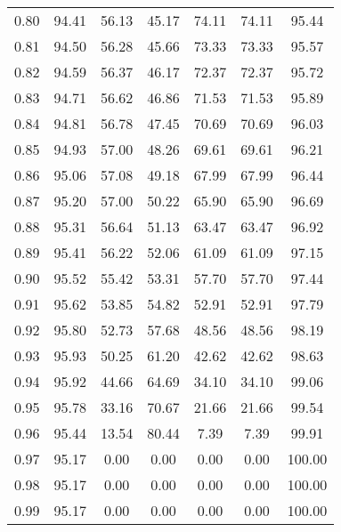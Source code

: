 \begin{tabular}{|c|c|c|c|c|c|c|}
      0.80 &     94.41 &     56.13 &      45.17 &   74.11 &      74.11 &         95.44 \\
      0.81 &     94.50 &     56.28 &      45.66 &   73.33 &      73.33 &         95.57 \\
      0.82 &     94.59 &     56.37 &      46.17 &   72.37 &      72.37 &         95.72 \\
      0.83 &     94.71 &     56.62 &      46.86 &   71.53 &      71.53 &         95.89 \\
      0.84 &     94.81 &     56.78 &      47.45 &   70.69 &      70.69 &         96.03 \\
      0.85 &     94.93 &     57.00 &      48.26 &   69.61 &      69.61 &         96.21 \\
      0.86 &     95.06 &     57.08 &      49.18 &   67.99 &      67.99 &         96.44 \\
      0.87 &     95.20 &     57.00 &      50.22 &   65.90 &      65.90 &         96.69 \\
      0.88 &     95.31 &     56.64 &      51.13 &   63.47 &      63.47 &         96.92 \\
      0.89 &     95.41 &     56.22 &      52.06 &   61.09 &      61.09 &         97.15 \\
      0.90 &     95.52 &     55.42 &      53.31 &   57.70 &      57.70 &         97.44 \\
      0.91 &     95.62 &     53.85 &      54.82 &   52.91 &      52.91 &         97.79 \\
      0.92 &     95.80 &     52.73 &      57.68 &   48.56 &      48.56 &         98.19 \\
      0.93 &     95.93 &     50.25 &      61.20 &   42.62 &      42.62 &         98.63 \\
      0.94 &     95.92 &     44.66 &      64.69 &   34.10 &      34.10 &         99.06 \\
      0.95 &     95.78 &     33.16 &      70.67 &   21.66 &      21.66 &         99.54 \\
      0.96 &     95.44 &     13.54 &      80.44 &    7.39 &       7.39 &         99.91 \\
      0.97 &     95.17 &      0.00 &       0.00 &    0.00 &       0.00 &        100.00 \\
      0.98 &     95.17 &      0.00 &       0.00 &    0.00 &       0.00 &        100.00 \\
      0.99 &     95.17 &      0.00 &       0.00 &    0.00 &       0.00 &        100.00 \\
\bottomrule
\end{tabular}
